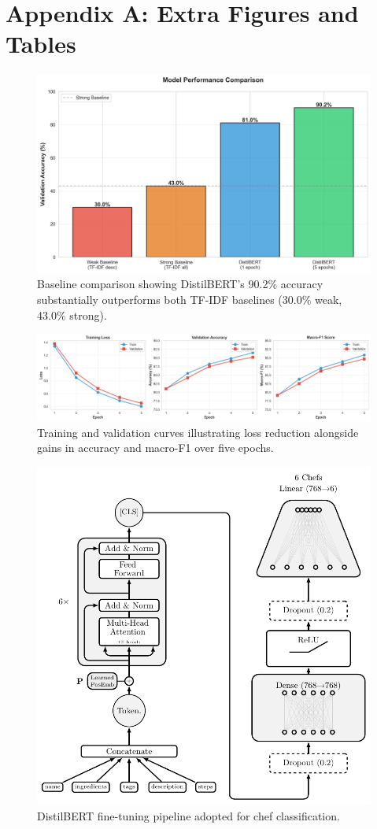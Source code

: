 \documentclass[twocolumn,10pt]{article}
\begin{document}

\appendix

\section*{Appendix A: Extra Figures and Tables}

\begin{figure}[h]
\centering
\includegraphics[width=0.8\columnwidth]{../results/figures/baseline_comparison.png}
\caption{Baseline comparison showing DistilBERT's 90.2\% accuracy substantially outperforms both TF-IDF baselines (30.0\% weak, 43.0\% strong).}
\label{fig:baseline}
\end{figure}

\begin{figure}[h]
\centering
\includegraphics[width=0.8\columnwidth]{../results/figures/training_curves.png}
\caption{Training and validation curves illustrating loss reduction alongside gains in accuracy and macro-F1 over five epochs.}
\label{fig:curves}
\end{figure}

\begin{figure}[h]
\centering
\includegraphics[width=0.9\columnwidth]{../results/figures/encoder.pdf}
\caption{DistilBERT fine-tuning pipeline adopted for chef classification.}
\label{fig:encoder}
\end{figure}
\end{document}

